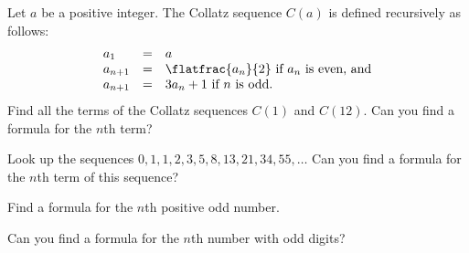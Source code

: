 \item Let $a$ be a positive integer. The Collatz sequence $C(a)$ is defined recursively as follows:
\begin{equation*}
  \begin{array}{lcl}
    a_1 &=& a \\
    a_{n+1}&=&\flatfrac{a_n}{2} \text { if } a_n \text{ is even, and}\\
    a_{n+1}&=&3a_n+1 \text{ if } n \text{ is odd.}
  \end{array}
\end{equation*}
Find all the terms of the Collatz sequences $C(1)$ and $C(12)$. Can you find a formula for the $n$th term?

\item Look up the sequences $0, 1, 1, 2, 3, 5, 8, 13, 21, 34, 55,\ldots$ Can you find a formula for the $n$th term of this sequence?
\item Find a formula for the $n$th positive odd number.
\item Can you find a formula for the $n$th number with odd digits?